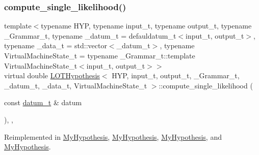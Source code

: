 \subsubsection{\texorpdfstring{compute\+\_\+single\+\_\+likelihood()}{compute\_single\_likelihood()}}
{\footnotesize\ttfamily template$<$typename H\+YP, typename input\+\_\+t, typename output\+\_\+t, typename \+\_\+\+Grammar\+\_\+t, typename \+\_\+datum\+\_\+t = defauldatum\+\_\+t$<$input\+\_\+t, output\+\_\+t$>$, typename \+\_\+data\+\_\+t = std\+::vector$<$\+\_\+datum\+\_\+t$>$, typename Virtual\+Machine\+State\+\_\+t = typename \+\_\+\+Grammar\+\_\+t\+::template Virtual\+Machine\+State\+\_\+t$<$input\+\_\+t, output\+\_\+t$>$$>$ \\
virtual double \hyperlink{class_l_o_t_hypothesis}{L\+O\+T\+Hypothesis}$<$ H\+YP, input\+\_\+t, output\+\_\+t, \+\_\+\+Grammar\+\_\+t, \+\_\+datum\+\_\+t, \+\_\+data\+\_\+t, Virtual\+Machine\+State\+\_\+t $>$\+::compute\+\_\+single\+\_\+likelihood (\begin{DoxyParamCaption}\item[{const \hyperlink{class_l_o_t_hypothesis_ae36b1f113f45ee5ac82660028672739b}{datum\+\_\+t} \&}]{datum }\end{DoxyParamCaption})\hspace{0.3cm}{\ttfamily [inline]}, {\ttfamily [override]}, {\ttfamily [virtual]}}



Reimplemented in \hyperlink{class_my_hypothesis_af2470b1e04711c06ee551deae15af4c1}{My\+Hypothesis}, \hyperlink{class_my_hypothesis_a480fc9e50d0faa0f5226f56187fd2eec}{My\+Hypothesis}, \hyperlink{class_my_hypothesis_af23a45a03a28ea4f42438e70d47acacb}{My\+Hypothesis}, and \hyperlink{class_my_hypothesis_af23a45a03a28ea4f42438e70d47acacb}{My\+Hypothesis}.

\mbox{\label{class_l_o_t_hypothesis_af643fa8b19e3bd0fa4682ab3566e29fc}} 

